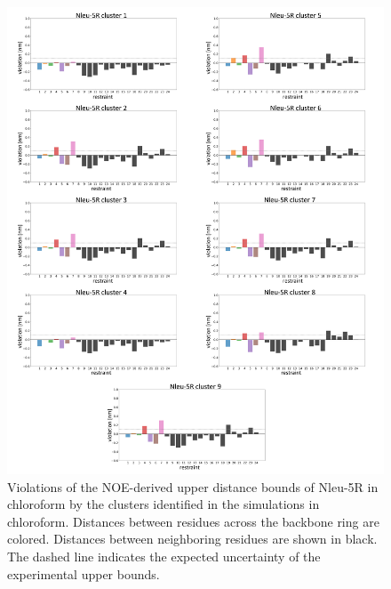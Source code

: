 \begin{figure}[h!]
    \centering
    \includegraphics[width=\textwidth]{7_chapter_5/fig/results/NMR_5R.png}
    \caption{Violations of the NOE-derived upper distance bounds of Nleu-5R in chloroform by the clusters identified in the simulations in chloroform. Distances between residues across the backbone ring are colored. Distances between neighboring residues are shown in black. The dashed line indicates the expected uncertainty of the experimental upper bounds.}
    \label{fig: SINOE violations Nleu-5R}
\end{figure}

